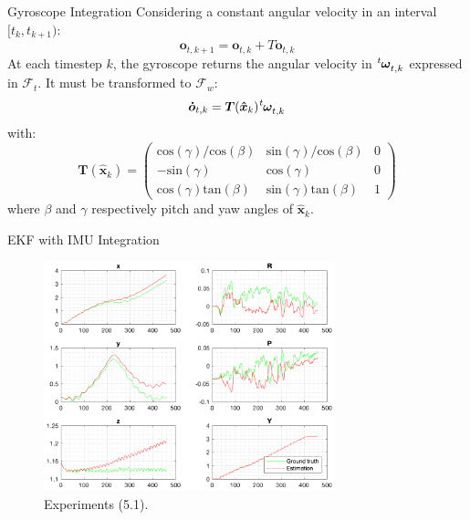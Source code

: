 \documentclass[10pt]{beamer}
\begin{document}
    \begin{frame}{Gyroscope Integration}
        Considering a constant angular velocity in an interval $[t_k, t_{k+1})$:
        \begin{equation*}
            \bm{o}_{t,k+1} = \bm{o}_{t,k} + T \bm{\dot{o}}_{t,k}
        \end{equation*}
        At each timestep $k$, the gyroscope returns the angular velocity in
        $\tensor[^t]{\bm{\omega}}{_{t,k}}$ expressed in $\mathcal{F}_t$.
        It must be transformed to $\mathcal{F}_w$:
        \begin{equation*}
            \bm{\dot{o}}_{t,k} = \bm{T}(\bm{\hat{x}}_{k}) \tensor[^t]{\bm{\omega}}{_{t,k}}
        \end{equation*}
        with:
        \begin{equation*}
            \bm{T}(\bm{\hat{x}}_{k}) =
            \begin{pmatrix}
                \text{cos}(\gamma)/\text{cos}(\beta) & \text{sin}(\gamma)/\text{cos}(\beta) & 0 \\
                -\text{sin}(\gamma) &  \text{cos}(\gamma) & 0 \\
                \text{cos}(\gamma) \text{tan}(\beta) & \text{sin}(\gamma) \text{tan}(\beta) & 1
            \end{pmatrix}
        \end{equation*}
        where $\beta$ and $\gamma$  respectively
        pitch and yaw angles of $\bm{\hat{x}}_{k}$.
    \end{frame}

    \begin{frame}{EKF with IMU Integration}
        \begin{figure}
        \caption{Experiments (5.1).}
        \centering
        \includegraphics[width=0.75\textwidth]{images/accelerometer.png}
        \end{figure}
    \end{frame}
\end{document}
